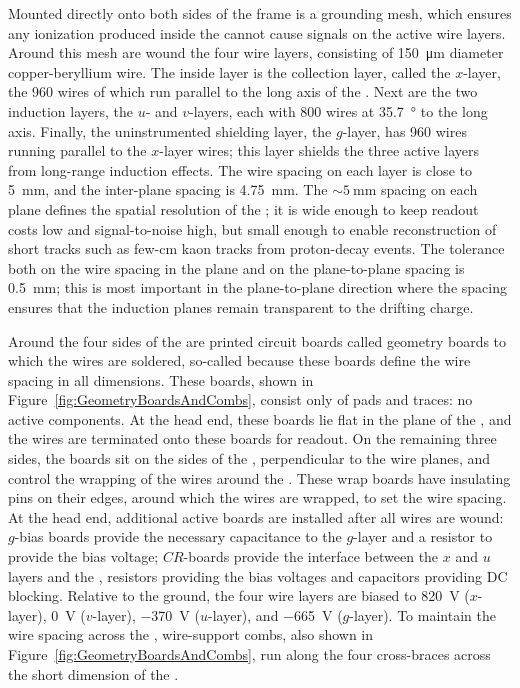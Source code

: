 Mounted directly onto both sides of the  frame is a grounding mesh, which ensures any ionization produced inside the  cannot cause signals on the active wire layers. Around this mesh are wound the four wire layers, consisting of \SI{150}{\micro\meter} diameter copper-beryllium wire. The inside layer is the collection layer, called the $x$-layer, the 960 wires of which run parallel to the long axis of the . Next are the two induction layers, the $u$- and $v$-layers, each with 800 wires at \SI{35.7}{\degree} to the long axis. Finally, the uninstrumented shielding layer, the $g$-layer, has 960 wires running parallel to the $x$-layer wires; this layer shields the three active layers from long-range induction effects. The wire spacing on each layer is close to \SI{5}{\mm}, and the inter-plane spacing is \SI{4.75}{\mm}. The $\sim\!\SI{5}{\mm}$ spacing on each plane defines the spatial resolution of the ; it is wide enough to keep readout costs low and signal-to-noise high, but small enough to enable reconstruction of short tracks such as few-\si{\cm} kaon tracks from proton-decay events. The tolerance both on the wire spacing in the plane and on the plane-to-plane spacing is \SI{0.5}{\mm}; this is most important in the plane-to-plane direction where the spacing ensures that the induction planes remain transparent to the drifting charge.

Around the four sides of the  are printed circuit boards called geometry boards to which the wires are soldered, so-called because these boards define the wire spacing in all dimensions. These boards, shown in Figure~\ref{fig:GeometryBoardsAndCombs}, consist only of pads and traces: no active components. At the head end, these boards lie flat in the plane of the , and the wires are terminated onto these boards for readout. On the remaining three sides, the boards sit on the sides of the , perpendicular to the wire planes, and control the wrapping of the wires around the . These wrap boards have insulating pins on their edges, around which the wires are wrapped, to set the wire spacing. At the head end, additional active boards are installed after all wires are wound: $g$-bias boards provide the necessary capacitance to the $g$-layer and a resistor to provide the bias voltage; $CR$-boards provide the interface between the $x$ and $u$ layers and the , resistors providing the bias voltages and capacitors providing DC blocking. Relative to the ground, the four wire layers are biased to \SI{820}{\volt} ($x$-layer), \SI{0}{\volt} ($v$-layer), \SI{-370}{\volt} ($u$-layer), and \SI{-665}{\volt} ($g$-layer). To maintain the wire spacing across the , wire-support combs, also shown in Figure~\ref{fig:GeometryBoardsAndCombs}, run along the four cross-braces across the short dimension of the .

